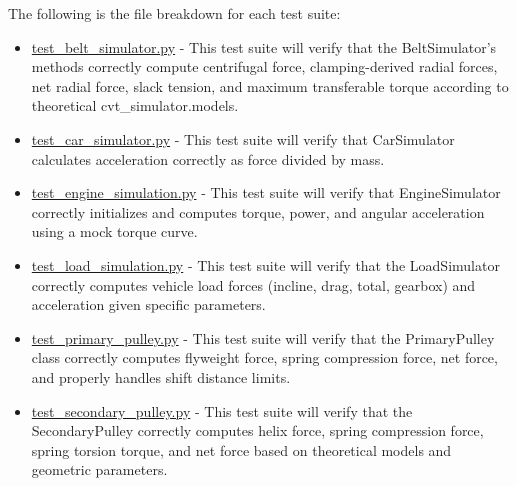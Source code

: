 \documentclass[12pt, titlepage]{article}
\begin{document}
\noindent The following is the file breakdown for each test suite:
\begin{itemize}
  \item \href{https://github.com/gr812b/CVT-Simulator/blob/main/test/simulations/test_belt_simulator.py}{test\_belt\_simulator.py} 
  \label{test:belt_simulator} - This test suite will verify that the BeltSimulator’s methods correctly compute centrifugal force, clamping-derived radial forces, net radial force, slack tension, and maximum transferable torque according to theoretical cvt_simulator.models.

  \item \href{https://github.com/gr812b/CVT-Simulator/blob/main/test/simulations/test_car_simulation.py}{test\_car\_simulator.py} 
  \label{test:car_simulator} - This test suite will verify that CarSimulator calculates acceleration correctly as force divided by mass.

  \item \href{https://github.com/gr812b/CVT-Simulator/blob/main/test/simulations/test_engine_simulation.py}{test\_engine\_simulation.py} 
  \label{test:engine_simulator} - This test suite will verify that EngineSimulator correctly initializes and computes torque, power, and angular acceleration using a mock torque curve.

  \item \href{https://github.com/gr812b/CVT-Simulator/blob/main/test/simulations/test_load_simulation.py}{test\_load\_simulation.py} 
  \label{test:load_simulator} - This test suite will verify that the LoadSimulator correctly computes vehicle load forces (incline, drag, total, gearbox) and acceleration given specific parameters.

  \item \href{https://github.com/gr812b/CVT-Simulator/blob/main/test/simulations/test_primary_pulley.py}{test\_primary\_pulley.py} 
  \label{test:primary_pulley} - This test suite will verify that the PrimaryPulley class correctly computes flyweight force, spring compression force, net force, and properly handles shift distance limits.

  \item \href{https://github.com/gr812b/CVT-Simulator/blob/main/test/simulations/test_secondary_pulley.py}{test\_secondary\_pulley.py}
  \label{test:secondary_pulley} - This test suite will verify that the SecondaryPulley correctly computes helix force, spring compression force, spring torsion torque, and net force based on theoretical models and geometric parameters.


\end{itemize}
\end{document}

